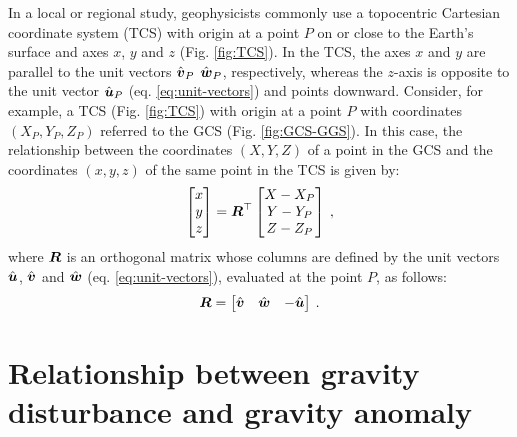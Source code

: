 \documentclass[extra]{gji}
\begin{document}
In a local or regional study, geophysicists commonly use a topocentric
Cartesian coordinate system (TCS) with origin at a point $P$ on or
close to the Earth's surface and axes $x$, $y$ and $z$ (Fig.
\ref{fig:TCS}). In the TCS, the axes $x$ and $y$ are parallel to
the unit vectors $\hat{\mitbf{v}}_{P}$ $\hat{\mitbf{w}}_{P}$, respectively,
whereas the $z$-axis is opposite to the unit vector
$\hat{\mitbf{u}}_{P}$ (eq. \ref{eq:unit-vectors}) and points downward.
Consider, for example, a TCS (Fig. \ref{fig:TCS}) with origin at a point $P$ with
coordinates $(X_{P}, Y_{P}, Z_{P})$ referred to the GCS (Fig. \ref{fig:GCS-GGS}).
In this case, the relationship between the coordinates $(X, Y, Z)$ of a
point in the GCS and the coordinates $(x, y, z)$ of the same point in the
TCS is given by:
\begin{equation}
\begin{bmatrix}
x \\
y \\
z
\end{bmatrix} =
\mitbf{R}^{\top} \begin{bmatrix}
X - X_{P} \\
Y - Y_{P} \\
Z - Z_{P}
\end{bmatrix} \: ,
\label{eq:GCS2TCS}
\end{equation}
where $\mitbf{R}$ is an orthogonal matrix whose columns
are defined by the unit vectors $\hat{\mitbf{u}}$, $\hat{\mitbf{v}}$ and
$\hat{\mitbf{w}}$ (eq. \ref{eq:unit-vectors}), evaluated at the
point $P$, as follows:
\begin{equation}
\mitbf{R} =
\begin{bmatrix}
\hat{\mitbf{v}} & \hat{\mitbf{w}} & -\hat{\mitbf{u}}
\end{bmatrix} \: .
\label{eq:R}
\end{equation}


\section{Relationship between gravity disturbance and gravity anomaly}
\end{document}
